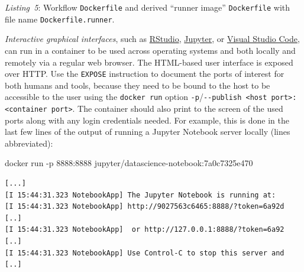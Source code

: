 \documentclass[10pt,letterpaper]{article}
\newenvironment{Shaded}{\begin{snugshade}}{\end{snugshade}}
\newcommand{\CommentTok}[1]{\textcolor[rgb]{0.56,0.35,0.01}{\textit{#1}}}
\newcommand{\ExtensionTok}[1]{#1}
\newcommand{\KeywordTok}[1]{\textcolor[rgb]{0.13,0.29,0.53}{\textbf{#1}}}
\newcommand{\NormalTok}[1]{#1}
\newcommand{\StringTok}[1]{\textcolor[rgb]{0.31,0.60,0.02}{#1}}
\begin{document}
\begin{Shaded}
\end{Shaded}

\normalsize

\emph{Listing~5}: Workflow \texttt{Dockerfile} and derived ``runner
image'' \texttt{Dockerfile} with file name \texttt{Dockerfile.runner}.
\newline

\emph{Interactive graphical interfaces}, such as
\href{https://rstudio.com/products/rstudio/}{RStudio},
\href{https://jupyter.org/}{Jupyter}, or
\href{https://code.visualstudio.com/}{Visual Studio Code}, can run in a
container to be used across operating systems and both locally and
remotely via a regular web browser. The HTML-based user interface is
exposed over HTTP. Use the \texttt{EXPOSE} instruction to document the
ports of interest for both humans and tools, because they need to be
bound to the host to be accessible to the user using the
\texttt{docker\ run} option
\texttt{-p}/\texttt{-\/-publish\ \textless{}host\ port\textgreater{}:\textless{}container\ port\textgreater{}}.
The container should also print to the screen of the used ports along
with any login credentials needed. For example, this is done in the last
few lines of the output of running a Jupyter Notebook server locally
(lines abbreviated):

\footnotesize

\begin{Shaded}
\begin{Highlighting}[]
\ExtensionTok{docker}\NormalTok{ run -p 8888:8888 jupyter/datascience-notebook:7a0c7325e470}
\end{Highlighting}
\end{Shaded}

\begin{verbatim}
[...]
[I 15:44:31.323 NotebookApp] The Jupyter Notebook is running at:
[I 15:44:31.323 NotebookApp] http://9027563c6465:8888/?token=6a92d [..]
[I 15:44:31.323 NotebookApp]  or http://127.0.0.1:8888/?token=6a92 [..]
[I 15:44:31.323 NotebookApp] Use Control-C to stop this server and [..]
\end{verbatim}
\end{document}
